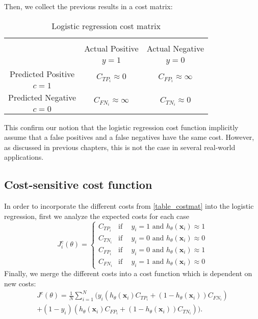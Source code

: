 \noindent Then, we collect the previous results in a cost matrix:
  \begin{table}[htbp]
    \centering
    \footnotesize
    \begin{tabular}{c|c|c}
      \multicolumn{3}{c}{}\\
      \multicolumn{1}{c|}{}  & Actual Positive& Actual Negative \\
      \multicolumn{1}{c|}{} & $y=1$& $y=0$ \\
      \hline
      Predicted Positive    & \multirow{ 2}{*}{$C_{{TP}_i}\approx 0$} & 
      \multirow{2}{*}{$C_{{FP}_i}\approx \infty$} \\
      $c=1$ & &\\
      \hline
      Predicted Negative    & \multirow{ 2}{*}{$C_{{FN}_i}\approx \infty$} & \multirow{ 
      2}{*}{$C_{{TN}_i}\approx 0$} \\
      $c=0$ & &\\
    \end{tabular}
    \caption{Logistic regression cost matrix}
    \label{tab:2:1}
  \end{table} 
  
This confirm our notion that the logistic regression cost function implicitly assume that 
a false positives and a false negatives have the same cost. However, as discussed in previous 
chapters, this is not the case in several real-world applications.

  
\subsection{Cost-sensitive cost function}
\label{sec:6:cscostfunction}

  In order to incorporate the different costs from \tablename{ \ref{table_costmat}} into the 
  logistic regression, first we analyze the expected costs for each case
  \begin{equation*}
    J^c_i(\theta) = 
    \begin{cases}
      C_{TP_i}    & \text{if} \phantom{-}  y_i = 1 \text{ and } h_\theta(\mathbf{x}_i) \approx 1  \\
      C_{TN_i}    & \text{if} \phantom{-}  y_i = 0 \text{ and } h_\theta(\mathbf{x}_i) \approx 0  \\
      C_{FP_i}    & \text{if} \phantom{-}  y_i = 0 \text{ and } h_\theta(\mathbf{x}_i) \approx 1  \\
      C_{FN_i}    & \text{if} \phantom{-}  y_i = 1 \text{ and } h_\theta(\mathbf{x}_i) \approx 0 
    \end{cases}
  \end{equation*}
  Finally, we merge the different costs into a cost function which is dependent on new costs:
  \begin{align}\label{eq:CSLR}
    J^c(\theta)=\frac{1}{N} \sum_{i=1}^{N} \bigg( y_i(h_\theta(\mathbf{x}_i) C_{TP_i} + 
    (1-h_\theta(\mathbf{x}_i))C_{FN_i})  \nonumber\\ 
    +(1-y_i)(h_\theta(\mathbf{x}_i) C_{FP_i} + (1-h_\theta(\mathbf{x}_i))C_{TN_i}) \bigg).
  \end{align}
  
